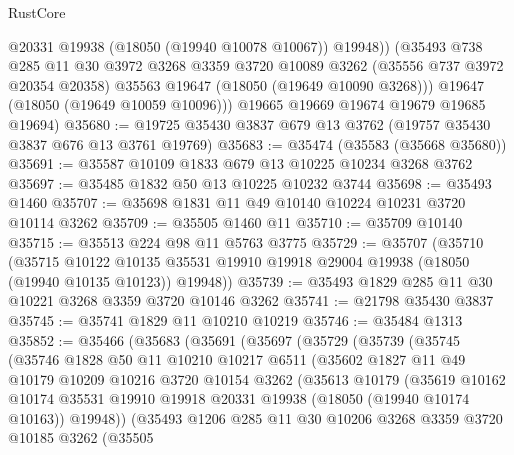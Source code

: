 \begin{lexlean}{RustCore}
\begin{coremodule}
            @20331
            @19938
            (@18050 (@19940 @10078 @10067))
            @19948))
        (@35493
          @738
          @285
          @11
          @30
          @3972
          @3268
          @3359
          @3720
          @10089
          @3262
          (@35556 @737 @3972 @20354 @20358)
          @35563
          @19647
          (@18050 (@19649 @10090 @3268)))
        @19647
        (@18050 (@19649 @10059 @10096)))
      @19665
      @19669
      @19674
      @19679
      @19685
      @19694)
@35680 := @19725 @35430 @3837 @679 @13 @3762 (@19757 @35430 @3837 @676 @13 @3761 @19769)
@35683 := @35474 (@35583 (@35668 @35680))
@35691 := @35587 @10109 @1833 @679 @13 @10225 @10234 @3268 @3762
@35697 := @35485 @1832 @50 @13 @10225 @10232 @3744
@35698 := @35493 @1460
@35707 := @35698 @1831 @11 @49 @10140 @10224 @10231 @3720 @10114 @3262
@35709 := @35505 @1460 @11
@35710 := @35709 @10140
@35715 := @35513 @224 @98 @11 @5763 @3775
@35729 := @35707
    (@35710
      (@35715
        @10122
        @10135
        @35531
        @19910
        @19918
        @29004
        @19938
        (@18050 (@19940 @10135 @10123))
        @19948))
@35739 := @35493 @1829 @285 @11 @30 @10221 @3268 @3359 @3720 @10146 @3262
@35741 := @21798 @35430 @3837
@35745 := @35741 @1829 @11 @10210 @10219
@35746 := @35484 @1313
@35852 := @35466
    (@35683
      (@35691
        (@35697
          (@35729
            (@35739
              (@35745
                (@35746
                  @1828
                  @50
                  @11
                  @10210
                  @10217
                  @6511
                  (@35602
                    @1827
                    @11
                    @49
                    @10179
                    @10209
                    @10216
                    @3720
                    @10154
                    @3262
                    (@35613
                      @10179
                      (@35619
                        @10162
                        @10174
                        @35531
                        @19910
                        @19918
                        @20331
                        @19938
                        (@18050 (@19940 @10174 @10163))
                        @19948))
                    (@35493
                      @1206
                      @285
                      @11
                      @30
                      @10206
                      @3268
                      @3359
                      @3720
                      @10185
                      @3262
                      (@35505

\end{coremodule}
\end{lexlean}
